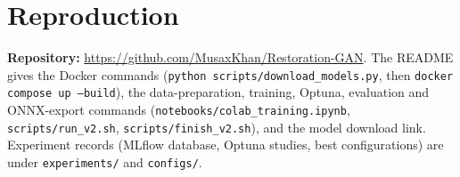 \section{Reproduction}
\textbf{Repository:} \url{https://github.com/MusaxKhan/Restoration-GAN}. The README gives the Docker commands (\texttt{python scripts/download\_models.py}, then \texttt{docker compose up --build}), the data-preparation, training, Optuna, evaluation and ONNX-export commands (\texttt{notebooks/colab\_training.ipynb}, \texttt{scripts/run\_v2.sh}, \texttt{scripts/finish\_v2.sh}), and the model download link. Experiment records (MLflow database, Optuna studies, best configurations) are under \texttt{experiments/} and \texttt{configs/}.
